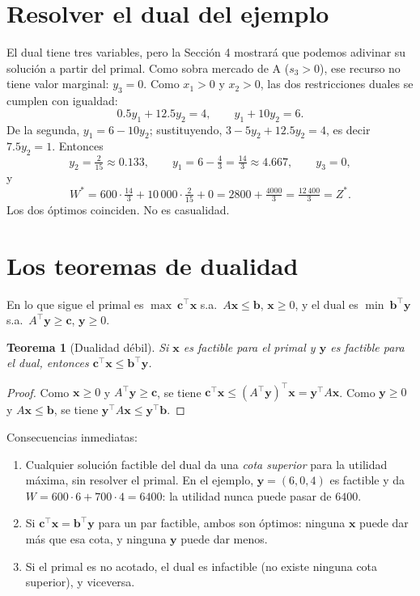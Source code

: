 \documentclass[a4paper,11pt]{article}
\theoremstyle{plain}
\newtheorem{teorema}{Teorema}[section]
\theoremstyle{definition}
\newcommand{\fr}[2]{\tfrac{#1}{#2}}
\begin{document}
\section{Resolver el dual del ejemplo}

El dual tiene tres variables, pero la Sección 4 mostrará que podemos adivinar su solución a partir del
primal. Como sobra mercado de A ($s_3>0$), ese recurso no tiene valor marginal: $y_3=0$. Como $x_1>0$ y
$x_2>0$, las dos restricciones duales se cumplen con igualdad:
\[
0.5y_1+12.5y_2=4,\qquad y_1+10y_2=6.
\]
De la segunda, $y_1=6-10y_2$; sustituyendo, $3-5y_2+12.5y_2=4$, es decir $7.5y_2=1$. Entonces
\[
y_2=\fr{2}{15}\approx0.133,\qquad y_1=6-\fr{4}{3}=\fr{14}{3}\approx4.667,\qquad y_3=0,
\]
y
\[
W^*=600\cdot\fr{14}{3}+10\,000\cdot\fr{2}{15}+0=2800+\fr{4000}{3}=\fr{12\,400}{3}=Z^*.
\]
Los dos óptimos coinciden. No es casualidad.

\section{Los teoremas de dualidad}

En lo que sigue el primal es $\max\ \mathbf c^\top\mathbf x$ s.a.\ $A\mathbf x\le\mathbf b$, $\mathbf x\ge0$, y el dual es
$\min\ \mathbf b^\top\mathbf y$ s.a.\ $A^\top\mathbf y\ge\mathbf c$, $\mathbf y\ge0$.

\begin{teorema}[Dualidad débil]
Si $\mathbf x$ es factible para el primal y $\mathbf y$ es factible para el dual, entonces
$\mathbf c^\top\mathbf x\le\mathbf b^\top\mathbf y$.
\end{teorema}
\begin{proof}
Como $\mathbf x\ge0$ y $A^\top\mathbf y\ge\mathbf c$, se tiene $\mathbf c^\top\mathbf x\le(A^\top\mathbf y)^\top\mathbf x=\mathbf y^\top A\mathbf x$. Como
$\mathbf y\ge0$ y $A\mathbf x\le\mathbf b$, se tiene $\mathbf y^\top A\mathbf x\le\mathbf y^\top\mathbf b$.
\end{proof}

Consecuencias inmediatas:
\begin{enumerate}
\item Cualquier solución factible del dual da una \emph{cota superior} para la utilidad máxima, sin resolver
el primal. En el ejemplo, $\mathbf y=(6,0,4)$ es factible y da $W=600\cdot6+700\cdot4=6400$: la utilidad
nunca puede pasar de $6400$.
\item Si $\mathbf c^\top\mathbf x=\mathbf b^\top\mathbf y$ para un par factible, ambos son óptimos: ninguna $\mathbf x$ puede dar más
que esa cota, y ninguna $\mathbf y$ puede dar menos.
\item Si el primal es no acotado, el dual es infactible (no existe ninguna cota superior), y viceversa.
\end{enumerate}
\end{document}
